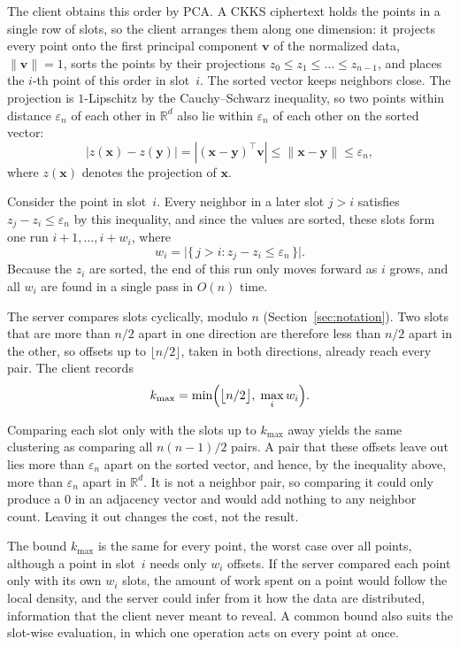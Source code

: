 The client obtains this order by PCA. A CKKS ciphertext holds the points
in a single row of slots, so the client arranges them along one
dimension: it projects every point onto the first principal component
$\mathbf{v}$ of the normalized data, $\|\mathbf{v}\| = 1$, sorts the
points by their projections $z_0 \le z_1 \le \dots \le z_{n-1}$, and
places the $i$-th point of this order in slot~$i$. The sorted vector keeps
neighbors close. The projection is $1$-Lipschitz by the Cauchy--Schwarz
inequality, so two points within distance $\varepsilon_n$ of each other
in $\mathbb{R}^d$ also lie within $\varepsilon_n$ of each other on the
sorted vector:
\[
  |z(\mathbf{x}) - z(\mathbf{y})|
  = |(\mathbf{x} - \mathbf{y})^{\top}\mathbf{v}|
  \le \|\mathbf{x} - \mathbf{y}\| \le \varepsilon_n ,
\]
where $z(\mathbf{x})$ denotes the projection of $\mathbf{x}$.

Consider the point in slot~$i$. Every neighbor in a later slot $j > i$
satisfies $z_j - z_i \le \varepsilon_n$ by this inequality, and
since the values are sorted, these slots form one run
$i+1, \dots, i+w_i$, where
\[
  w_i = \bigl| \{\, j > i : z_j - z_i \le \varepsilon_n \,\} \bigr| .
\]
Because the $z_i$ are sorted, the end of this run only moves forward as
$i$ grows, and all $w_i$ are found in a single pass in $O(n)$ time.

The server compares slots cyclically, modulo $n$
(Section~\ref{sec:notation}). Two slots that are more than $n/2$ apart
in one direction are therefore less than $n/2$ apart in the other, so
offsets up to $\lfloor n/2 \rfloor$, taken in both directions, already
reach every pair. The client records
\[
  k_{\max} = \min\Bigl( \bigl\lfloor n/2 \bigr\rfloor, \;
    \max_{i} w_i \Bigr).
\]

Comparing each slot only with the slots up to $k_{\max}$ away yields the
same clustering as comparing all $n(n-1)/2$ pairs. A pair that these
offsets leave out lies more than $\varepsilon_n$ apart on the sorted
vector, and hence, by the inequality above, more than $\varepsilon_n$
apart in $\mathbb{R}^d$. It is not a neighbor pair, so comparing it could
only produce a $0$ in an adjacency vector and would add nothing to any
neighbor count. Leaving it out changes the cost, not the result.

The bound $k_{\max}$ is the same for every point, the worst case over all
points, although a point in slot~$i$ needs only $w_i$ offsets. If the
server compared each point only with its own $w_i$ slots, the amount of
work spent on a point would follow the local density, and the server
could infer from it how the data are distributed, information that the
client never meant to reveal. A common bound also suits the slot-wise
evaluation, in which one operation acts on every point at once.

